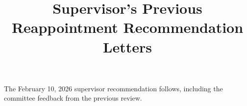 \title{Supervisor's Previous Reappointment Recommendation Letters}
\portfoliotitle
The February 10, 2026 supervisor recommendation follows, including the committee feedback from the previous review.

